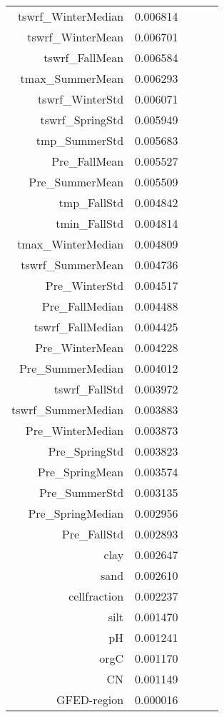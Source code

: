 \begin{tabular}{rrrrr}
tswrf_WinterMedian & 0.006814 \\
tswrf_WinterMean & 0.006701 \\
tswrf_FallMean & 0.006584 \\
tmax_SummerMean & 0.006293 \\
tswrf_WinterStd & 0.006071 \\
tswrf_SpringStd & 0.005949 \\
tmp_SummerStd & 0.005683 \\
Pre_FallMean & 0.005527 \\
Pre_SummerMean & 0.005509 \\
tmp_FallStd & 0.004842 \\
tmin_FallStd & 0.004814 \\
tmax_WinterMedian & 0.004809 \\
tswrf_SummerMean & 0.004736 \\
Pre_WinterStd & 0.004517 \\
Pre_FallMedian & 0.004488 \\
tswrf_FallMedian & 0.004425 \\
Pre_WinterMean & 0.004228 \\
Pre_SummerMedian & 0.004012 \\
tswrf_FallStd & 0.003972 \\
tswrf_SummerMedian & 0.003883 \\
Pre_WinterMedian & 0.003873 \\
Pre_SpringStd & 0.003823 \\
Pre_SpringMean & 0.003574 \\
Pre_SummerStd & 0.003135 \\
Pre_SpringMedian & 0.002956 \\
Pre_FallStd & 0.002893 \\
clay & 0.002647 \\
sand & 0.002610 \\
cellfraction & 0.002237 \\
silt & 0.001470 \\
pH & 0.001241 \\
orgC & 0.001170 \\
CN & 0.001149 \\
GFED-region & 0.000016 \\
\bottomrule
\end{tabular}

